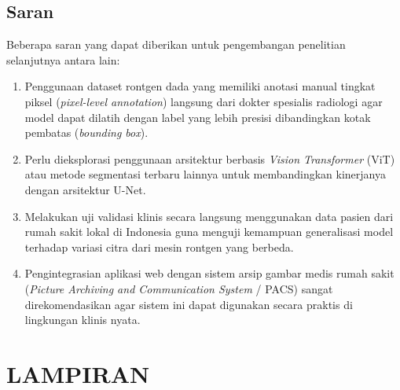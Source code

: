 \documentclass[12pt,a4paper,oneside]{book}
\newcommand{\addfrontmattertoc}[1]{%
  \addtocontents{toc}{\protect\contentsline{chapter}{\textnormal{#1}}{\textnormal{\thepage}}{}}%
}
\begin{document}
\section{Saran}

Beberapa saran yang dapat diberikan untuk pengembangan penelitian selanjutnya antara lain:
\begin{enumerate}
  \item Penggunaan dataset rontgen dada yang memiliki anotasi manual tingkat piksel (\textit{pixel-level annotation}) langsung dari dokter spesialis radiologi agar model dapat dilatih dengan label yang lebih presisi dibandingkan kotak pembatas (\textit{bounding box}).
  \item Perlu dieksplorasi penggunaan arsitektur berbasis \textit{Vision Transformer} (ViT) atau metode segmentasi terbaru lainnya untuk membandingkan kinerjanya dengan arsitektur U-Net.
  \item Melakukan uji validasi klinis secara langsung menggunakan data pasien dari rumah sakit lokal di Indonesia guna menguji kemampuan generalisasi model terhadap variasi citra dari mesin rontgen yang berbeda.
  \item Pengintegrasian aplikasi web dengan sistem arsip gambar medis rumah sakit (\textit{Picture Archiving and Communication System} / PACS) sangat direkomendasikan agar sistem ini dapat digunakan secara praktis di lingkungan klinis nyata.
\end{enumerate}


\backmatter

\singlespacing

\renewcommand{\bibfont}{\fontsize{12pt}{12pt}\selectfont}

\setlength{\bibitemsep}{1\baselineskip}

\nocite{*}
\printbibliography[heading=bibintoc,title={DAFTAR PUSTAKA}]

\newpage
\chapter*{LAMPIRAN}
\addfrontmattertoc{LAMPIRAN}
\end{document}
